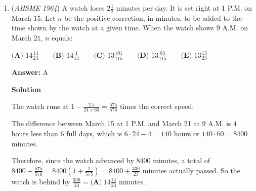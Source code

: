 \begin{enumerate}
 By the exterior angle theorem, $\angle AA'C > \angle ABC \geq \angle ACB$, so $AA' < AC = b$.

 Similarly, $\angle BB'C > \angle BAC \geq \angle BCA$, so $BB' < BC = a$.

 Also, $\angle CC'B > \angle BAC \geq \angle ABC$, so $CC' < BC = a$.

 Thus $s = AA' + BB' + CC' < b + a + a = \boxed{\textbf{(A)}\ 2a + b}$.

 -edited by j314andrews

 



\textbf{Solution 2 (Answer Choices)}

This question has a unique correct answer, so if choice (X) is always less than or equal to choice (Y), then (X) must be incorrect, as otherwise (Y) would also be correct.

 Since $c \leq b$, $2a + c \leq 2a + b$, so (B) is incorrect.

 Since $b \leq a$, $2b + c \leq 2a + c$, so (C) is incorrect.

 Since $b \leq a$, $b + a + b \leq a + a + b$, that is, $a + 2b \leq 2a + b$.  So (D) is incorrect.

 Since $c \leq a$, $c + a + b \leq a + a + b$, that is, $a + b + c \leq 2a + b$.  So (E) is incorrect.

 Therefore, by process of elimination $\boxed{\textbf{(A)}\ 2a + b}$ is correct.

 -j314andrews

 


	\item (\textit{AHSME 1964}) A watch loses $2\frac{1}{2}$ minutes per day. It is set right at $1$ P.M. on March $15$. 
Let $n$ be the positive correction, in minutes, to be added to the time shown by the watch at a given time. 
When the watch shows $9$ A.M. on March $21$, $n$ equals:


 $\textbf{(A) }14\frac{14}{23}\qquad \textbf{(B) }14\frac{1}{14}\qquad \textbf{(C) }13\frac{101}{115}\qquad \textbf{(D) }13\frac{83}{115}\qquad \textbf{(E) }13\frac{13}{23}$

 \textbf{Answer: }A



\textbf{Solution}

The watch runs at $1 - \frac{2.5}{24\times 60} = \frac{575}{576}$ times the correct speed.

 The difference between March 15 at 1 P.M. and March 21 at 9 A.M. is $4$ hours less than $6$ full days, which is $6 \cdot 24 - 4 = 140$ hours or $140 \cdot 60 = 8400$ minutes.

 Therefore, since the watch advanced by $8400$ minutes, a total of $8400 \div \frac{575}{576} = 8400\left(1 + \frac{1}{575} \right) = 8400 + \frac{336}{23}$ minutes actually passed.  So the watch is behind by $\frac{336}{23} = \boxed{\textbf{(A)}\ 14\frac{14}{23}}$ minutes.

 


\end{enumerate}